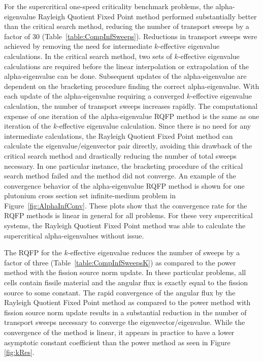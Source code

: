 For the supercritical one-speed criticality benchmark problems, the alpha-eigenvalue Rayleigh Quotient Fixed Point method performed substantially better than the critical search method, reducing the number of transport sweeps by a factor of 30 (Table~\ref{table:CompInfSweeps}). Reductions in transport sweeps were achieved by removing the need for intermediate $k$-effective eigenvalue calculations. In the critical search method, two sets of $k$-effective eigenvalue calculations are required before the linear interpolation or extrapolation of the alpha-eigenvalue can be done. Subsequent updates of the alpha-eigenvalue are dependent on the bracketing procedure finding the correct alpha-eigenvalue. With each update of the alpha-eigenvalue requiring a converged $k$-effective eigenvalue calculation, the number of transport sweeps increases rapidly. The computational expense of one iteration of the alpha-eigenvalue RQFP method is the same as one iteration of the $k$-effective eigenvalue calculation. Since there is no need for any intermediate calculations, the Rayleigh Quotient Fixed Point method can calculate the eigenvalue/eigenvector pair directly, avoiding this drawback of the critical search method and drastically reducing the number of total sweeps necessary. In one particular instance, the bracketing procedure of the critical search method failed and the method did not converge. An example of the convergence behavior of the alpha-eigenvalue RQFP method is shown for one plutonium cross section set infinite-medium problem in Figure~\ref{fig:AlphaInfConv}. These plots show that the convergence rate for the RQFP methods is linear in general for all problems. For these very supercritical systems, the Rayleigh Quotient Fixed Point method was able to calculate the supercritical alpha-eigenvalues without issue.

The RQFP for the $k$-effective eigenvalue reduces the number of sweeps by a factor of three (Table~\ref{table:CompInfSweepsK}) as compared to the power method with the fission source norm update. In these particular problems, all cells contain fissile material and the angular flux is exactly equal to the fission source to some constant. The rapid convergence of the angular flux by the Rayleigh Quotient Fixed Point method as compared to the power method with fission source norm update results in a substantial reduction in the number of transport sweeps necessary to converge the eigenvector/eigenvalue. While the convergence of the method is linear, it appears in practice to have a lower asymptotic constant coefficient than the power method as seen in Figure \ref{fig:kRes}.

